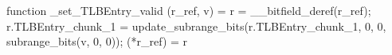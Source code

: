 function _set_TLBEntry_valid (r_ref, v) = {
    r = __bitfield_deref(r_ref);
    r.TLBEntry_chunk_1 = update_subrange_bits(r.TLBEntry_chunk_1, 0, 0, subrange_bits(v, 0, 0));
    (*r_ref) = r
}
